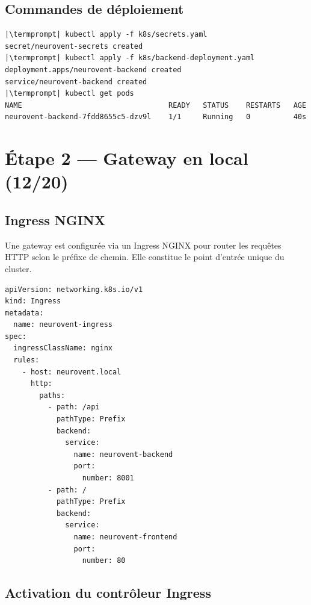 \documentclass[12pt,a4paper]{article}
\makeatletter
\newcommand{\termprompt}{%
  \textcolor{termgreen}{\textbf{azouaou@Az-zou}}%
  \textcolor{termfg}{:}%
  \textcolor{termcyan}{\textasciitilde/NeuroVent}%
  \textcolor{termfg}{\$}}
\makeatother
\begin{document}
\subsection{Commandes de déploiement}

\begin{lstlisting}[style=terminal, caption={Déploiement initial du backend}]
|\termprompt| kubectl apply -f k8s/secrets.yaml
secret/neurovent-secrets created
|\termprompt| kubectl apply -f k8s/backend-deployment.yaml
deployment.apps/neurovent-backend created
service/neurovent-backend created
|\termprompt| kubectl get pods
NAME                                  READY   STATUS    RESTARTS   AGE
neurovent-backend-7fdd8655c5-dzv9l    1/1     Running   0          40s
\end{lstlisting}

\section{Étape 2 — Gateway en local (12/20)}

\subsection{Ingress NGINX}

Une gateway est configurée via un Ingress NGINX pour router les requêtes HTTP
selon le préfixe de chemin. Elle constitue le point d'entrée unique du cluster.

\begin{lstlisting}[style=yaml, caption={k8s/ingress.yaml}]
apiVersion: networking.k8s.io/v1
kind: Ingress
metadata:
  name: neurovent-ingress
spec:
  ingressClassName: nginx
  rules:
    - host: neurovent.local
      http:
        paths:
          - path: /api
            pathType: Prefix
            backend:
              service:
                name: neurovent-backend
                port:
                  number: 8001
          - path: /
            pathType: Prefix
            backend:
              service:
                name: neurovent-frontend
                port:
                  number: 80
\end{lstlisting}

\subsection{Activation du contrôleur Ingress}
\end{document}
